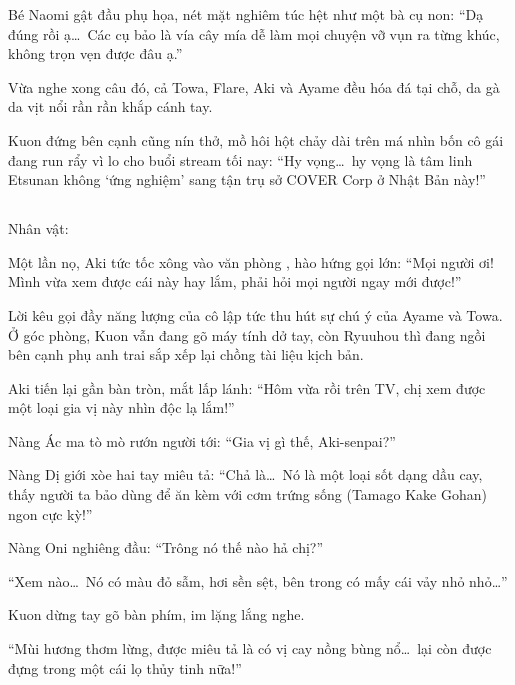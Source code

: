 \documentclass[../main.tex]{subfiles}
\begin{document}
Bé Naomi gật đầu phụ họa, nét mặt nghiêm túc hệt như một bà cụ non: ``Dạ đúng rồi ạ\dots\ Các cụ bảo là vía cây mía dễ làm mọi chuyện vỡ vụn ra từng khúc, không trọn vẹn được đâu ạ.''

Vừa nghe xong câu đó, cả Towa, Flare, Aki và Ayame đều hóa đá tại chỗ, da gà da vịt nổi rần rần khắp cánh tay.

Kuon đứng bên cạnh cũng nín thở, mồ hôi hột chảy dài trên má nhìn bốn cô gái đang run rẩy vì lo cho buổi stream tối nay: ``Hy vọng\dots\ hy vọng là tâm linh Etsunan không `ứng nghiệm' sang tận trụ sở COVER Corp ở Nhật Bản này!''

\newpage

\subsection*{\label{ep-C9.V}}
\vspace{-4pt}
\begin{center}
  {\caviar\fontsize{12pt}{12pt}\selectfont Nhân vật:}
\end{center}

Một lần nọ, Aki tức tốc xông vào văn phòng \hll, hào hứng gọi lớn: ``Mọi người ơi! Mình vừa xem được cái này hay lắm, phải hỏi mọi người ngay mới được!''

Lời kêu gọi đầy năng lượng của cô lập tức thu hút sự chú ý của Ayame và Towa. Ở góc phòng, Kuon vẫn đang gõ máy tính dở tay, còn Ryuuhou thì đang ngồi bên cạnh phụ anh trai sắp xếp lại chồng tài liệu kịch bản.

Aki tiến lại gần bàn tròn, mắt lấp lánh: ``Hôm vừa rồi trên TV, chị xem được một loại gia vị này nhìn độc lạ lắm!''

Nàng Ác ma tò mò rướn người tới: ``Gia vị gì thế, Aki-senpai?''

Nàng Dị giới xòe hai tay miêu tả: ``Chả là\dots\ Nó là một loại sốt dạng dầu cay, thấy người ta bảo dùng để ăn kèm với cơm trứng sống (Tamago Kake Gohan) ngon cực kỳ!''

Nàng Oni nghiêng đầu: ``Trông nó thế nào hả chị?''

``Xem nào\dots\ Nó có màu đỏ sẫm, hơi sền sệt, bên trong có mấy cái vảy nhỏ nhỏ\dots''

Kuon dừng tay gõ bàn phím, im lặng lắng nghe.

``Mùi hương thơm lừng, được miêu tả là có vị cay nồng bùng nổ\dots\ lại còn được đựng trong một cái lọ thủy tinh nữa!''
\end{document}
